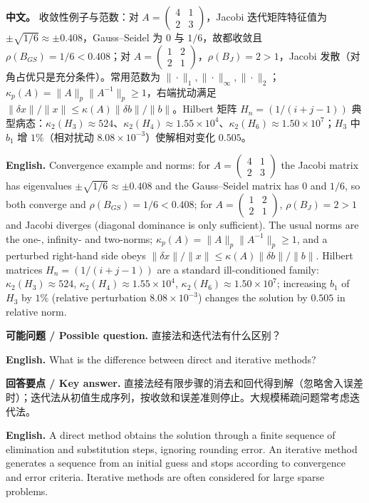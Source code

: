 \documentclass[UTF8,11pt,a4paper]{ctexart}
\newcommand{\EN}[1]{\par\noindent\textbf{English.} #1\par}
\newcommand{\ASK}[4]{\par\noindent\textbf{可能问题 / Possible question.} #1\par\EN{#2}\noindent\textbf{回答要点 / Key answer.} #3\par\EN{#4}\medskip}
\newcommand{\APS}[2]{\par\noindent\textbf{中文。} #1\par\noindent\textbf{English.} #2\par\smallskip}
\begin{document}
\APS{收敛性例子与范数：对 $A=\begin{pmatrix}4&1\\2&3\end{pmatrix}$，Jacobi 迭代矩阵特征值为 $\pm\sqrt{1/6}\approx\pm0.408$，Gauss--Seidel 为 $0$ 与 $1/6$，故都收敛且 $\rho(B_{GS})=1/6<0.408$；对 $A=\begin{pmatrix}1&2\\2&1\end{pmatrix}$，$\rho(B_J)=2>1$，Jacobi 发散（对角占优只是充分条件）。常用范数为 $\|\cdot\|_1,\|\cdot\|_\infty,\|\cdot\|_2$；$\kappa_p(A)=\|A\|_p\|A^{-1}\|_p\ge1$，右端扰动满足 $\|\delta x\|/\|x\|\le\kappa(A)\|\delta b\|/\|b\|$。Hilbert 矩阵 $H_n=(1/(i+j-1))$ 典型病态：$\kappa_2(H_3)\approx524$、$\kappa_2(H_4)\approx1.55\times10^{4}$、$\kappa_2(H_6)\approx1.50\times10^{7}$；$H_3$ 中 $b_1$ 增 $1\%$（相对扰动 $8.08\times10^{-3}$）使解相对变化 $0.505$。}{Convergence example and norms: for $A=\begin{pmatrix}4&1\\2&3\end{pmatrix}$ the Jacobi matrix has eigenvalues $\pm\sqrt{1/6}\approx\pm0.408$ and the Gauss--Seidel matrix has $0$ and $1/6$, so both converge and $\rho(B_{GS})=1/6<0.408$; for $A=\begin{pmatrix}1&2\\2&1\end{pmatrix}$, $\rho(B_J)=2>1$ and Jacobi diverges (diagonal dominance is only sufficient). The usual norms are the one-, infinity- and two-norms; $\kappa_p(A)=\|A\|_p\|A^{-1}\|_p\ge1$, and a perturbed right-hand side obeys $\|\delta x\|/\|x\|\le\kappa(A)\|\delta b\|/\|b\|$. Hilbert matrices $H_n=(1/(i+j-1))$ are a standard ill-conditioned family: $\kappa_2(H_3)\approx524$, $\kappa_2(H_4)\approx1.55\times10^{4}$, $\kappa_2(H_6)\approx1.50\times10^{7}$; increasing $b_1$ of $H_3$ by $1\%$ (relative perturbation $8.08\times10^{-3}$) changes the solution by $0.505$ in relative norm.}

\ASK{直接法和迭代法有什么区别？}{What is the difference between direct and iterative methods?}{直接法经有限步骤的消去和回代得到解（忽略舍入误差时）；迭代法从初值生成序列，按收敛和误差准则停止。大规模稀疏问题常考虑迭代法。}{A direct method obtains the solution through a finite sequence of elimination and substitution steps, ignoring rounding error. An iterative method generates a sequence from an initial guess and stops according to convergence and error criteria. Iterative methods are often considered for large sparse problems.}
\end{document}
